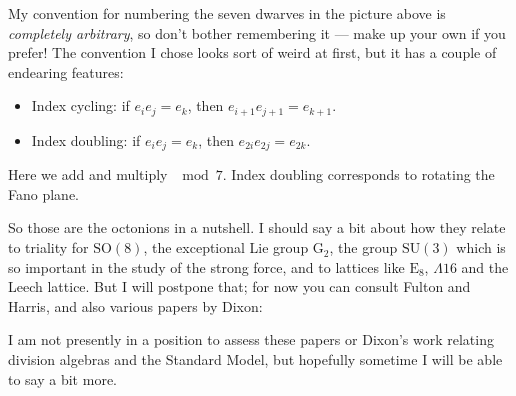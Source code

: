 \documentclass{article}
\def\tightlist{}
\renewcommand{\texttt}[1]{%
  \begingroup
  \ttfamily
  \begingroup\lccode`~=`/\lowercase{\endgroup\def~}{/\discretionary{}{}{}}%
  \begingroup\lccode`~=`[\lowercase{\endgroup\def~}{[\discretionary{}{}{}}%
  \begingroup\lccode`~=`.\lowercase{\endgroup\def~}{.\discretionary{}{}{}}%
  \catcode`/=\active\catcode`[=\active\catcode`.=\active
  \scantokens{#1\noexpand}%
  \endgroup
}
\begin{document}
My convention for numbering the seven dwarves in the picture above is
\emph{completely arbitrary}, so don't bother remembering it --- make up
your own if you prefer! The convention I chose looks sort of weird at
first, but it has a couple of endearing features:

\begin{itemize}
\tightlist
\item
  Index cycling: if \(e_i e_j = e_k\), then
  \(e_{i+1} e_{j+1} = e_{k+1}\).
\item
  Index doubling: if \(e_i e_j = e_k\), then \(e_{2i} e_{2j} = e_{2k}\).
\end{itemize}

Here we add and multiply \(\mod 7\). Index doubling corresponds to
rotating the Fano plane.

So those are the octonions in a nutshell. I should say a bit about how
they relate to triality for \(\mathrm{SO}(8)\), the exceptional Lie
group \(\mathrm{G}_2\), the group \(\mathrm{SU}(3)\) which is so
important in the study of the strong force, and to lattices like
\(\mathrm{E}_8\), \(\Lambda 16\) and the Leech lattice. But I will
postpone that; for now you can consult Fulton and Harris, and also
various papers by Dixon:


I am not presently in a position to assess these papers or Dixon's work
relating division algebras and the Standard Model, but hopefully
sometime I will be able to say a bit more.
\end{document}
